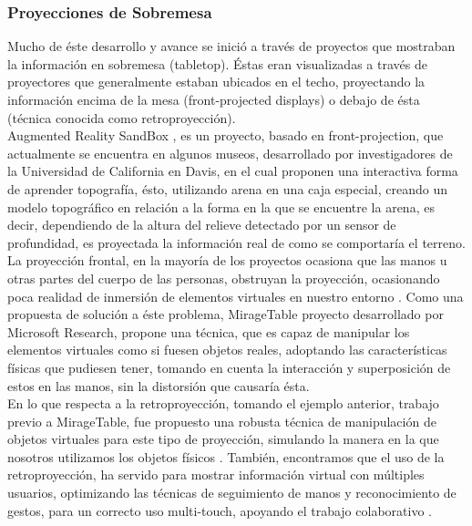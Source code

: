 \documentclass[a4paper,openright,12pt]{report}
\begin{document}
\subsubsection{Proyecciones de Sobremesa}
Mucho de éste desarrollo y avance se inició a través de proyectos que mostraban la información en sobremesa (tabletop). Éstas eran visualizadas a través de proyectores que generalmente estaban ubicados en el techo, proyectando la información encima de la mesa (front-projected displays) o debajo de ésta (técnica conocida como retroproyección).\\
Augmented Reality SandBox \cite{kreylos2016}, es un proyecto, basado en front-projection, que actualmente se encuentra en algunos museos, desarrollado por investigadores de la Universidad de California en Davis, en el cual proponen una interactiva forma de aprender topografía, ésto, utilizando arena en una caja especial, creando un modelo topográfico en relación a la forma en la que se encuentre la arena, es decir, dependiendo de la altura del relieve detectado por un sensor de profundidad, es proyectada la información real de como se comportaría el terreno.\\
La proyección frontal, en la mayoría de los proyectos ocasiona que las manos u otras partes del cuerpo de las personas, obstruyan la proyección, ocasionando poca realidad de inmersión de elementos virtuales en nuestro entorno \cite{dietz2001,wilson2005,kreylos2016}. Como una propuesta de solución a éste problema, MirageTable \cite{benko2012} proyecto desarrollado por Microsoft Research, propone una técnica, que es capaz de manipular los elementos virtuales como si fuesen objetos reales, adoptando las características físicas que pudiesen tener, tomando en cuenta la interacción y superposición de estos en las manos, sin la distorsión que causaría ésta.\\
En lo que respecta a la retroproyección, tomando el ejemplo anterior, trabajo previo a MirageTable, fue propuesto una robusta técnica de manipulación de objetos virtuales para este tipo de proyección, simulando la manera en la que nosotros utilizamos los objetos físicos \cite{hilliges2009}. También, encontramos que el uso de la retroproyección, ha servido para mostrar información virtual con múltiples usuarios, optimizando las técnicas de seguimiento de manos y reconocimiento de gestos, para un correcto uso multi-touch, apoyando el trabajo colaborativo \cite{geller2006,dohse2008}.\\
\end{document}
